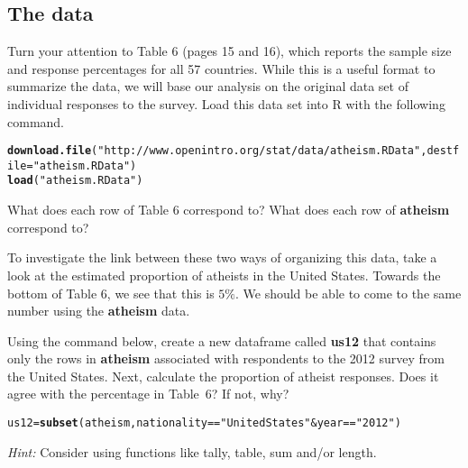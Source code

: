 \documentclass{article}\usepackage[]{graphicx}\usepackage[]{color}
\makeatletter
\newcommand{\hlnum}[1]{\textcolor[rgb]{0.686,0.059,0.569}{#1}}%
\newcommand{\hlstr}[1]{\textcolor[rgb]{0.192,0.494,0.8}{#1}}%
\newcommand{\hlopt}[1]{\textcolor[rgb]{0,0,0}{#1}}%
\newcommand{\hlstd}[1]{\textcolor[rgb]{0.345,0.345,0.345}{#1}}%
\newcommand{\hlkwb}[1]{\textcolor[rgb]{0.69,0.353,0.396}{#1}}%
\newcommand{\hlkwc}[1]{\textcolor[rgb]{0.333,0.667,0.333}{#1}}%
\newcommand{\hlkwd}[1]{\textcolor[rgb]{0.737,0.353,0.396}{\textbf{#1}}}%
\newenvironment{kframe}{%
 \def\at@end@of@kframe{}%
 \ifinner\ifhmode%
  \def\at@end@of@kframe{\end{minipage}}%
  \begin{minipage}{\columnwidth}%
 \fi\fi%
 \def\FrameCommand##1{\hskip\@totalleftmargin \hskip-\fboxsep
 \colorbox{shadecolor}{##1}\hskip-\fboxsep
     \hskip-\linewidth \hskip-\@totalleftmargin \hskip\columnwidth}%
 \MakeFramed {\advance\hsize-\width
   \@totalleftmargin\z@ \linewidth\hsize
   \@setminipage}}%
 {\par\unskip\endMakeFramed%
 \at@end@of@kframe}
\newenvironment{knitrout}{}{} %
\makeatother
\begin{document}
\subsection*{The data}
Turn your attention to Table 6 (pages 15 and 16), which reports the sample size and response percentages for all 57 countries. While this is a useful format to summarize the data, we will base our analysis on the original data set of individual responses to the survey. Load this data set into R with the following command.

\begin{knitrout}
\color{fgcolor}\begin{kframe}
\begin{alltt}
\hlkwd{download.file}\hlstd{(}\hlstr{"http://www.openintro.org/stat/data/atheism.RData"}\hlstd{,} \hlkwc{destfile} \hlstd{=} \hlstr{"atheism.RData"}\hlstd{)}
\hlkwd{load}\hlstd{(}\hlstr{"atheism.RData"}\hlstd{)}
\end{alltt}
\end{kframe}
\end{knitrout}

\begin{exercise}
What does each row of Table 6 correspond to? What does each row of \hlkwd{atheism} correspond to?
\end{exercise}

To investigate the link between these two ways of organizing this data, take a look at the estimated proportion of atheists in the United States. Towards the bottom of Table 6, we see that this is $5\%$. We should be able to come to the same number using the \hlkwd{atheism} data.

\begin{exercise}
Using the command below, create a new dataframe called \hlkwd{us12} that contains only the rows in \hlkwd{atheism} associated with respondents to the 2012 survey from the United States. Next, calculate the proportion of atheist responses. Does it agree with the percentage in Table~6? If not, why?

\begin{knitrout}
\color{fgcolor}\begin{kframe}
\begin{alltt}
\hlstd{us12} \hlkwb{=} \hlkwd{subset}\hlstd{(atheism, nationality} \hlopt{==} \hlstr{"United States"} \hlopt{&} \hlstd{year} \hlopt{==} \hlstr{"2012"}\hlstd{)}
\end{alltt}
\end{kframe}
\end{knitrout}


\emph{Hint:} Consider using functions like \hlnum{tally, table, sum} and/or \hlnum{length}.

\end{exercise}
\end{document}
